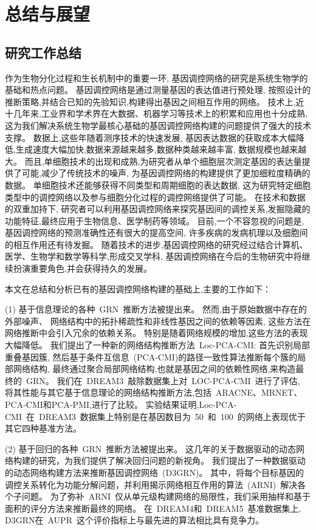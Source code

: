 \section{总结与展望}

\subsection{研究工作总结}

作为生物分化过程和生长机制中的重要一环,
基因调控网络的研究是系统生物学的基础和热点问题。
基因调控网络是通过测量基因的表达值进行预处理,
按照设计的推断策略,并结合已知的先验知识,构建得出基因之间相互作用的网络。
技术上,近十几年来,工业界和学术界在大数据、机器学习等技术上的积累和应用也十分成熟,
这为我们解决系统生物学最核心基础的基因调控网络构建的问题提供了强大的技术支撑。
数据上,这些年随着测序技术的快速发展,
基因表达数据的获取成本大幅降低,生成速度大幅加快,数据来源越来越多,数据种类越来越丰富, 数据规模也越来越大。
而且,单细胞技术的出现和成熟,为研究者从单个细胞层次测定基因的表达量提供了可能,减少了传统技术的噪声,
为基因调控网络的构建提供了更加细粒度精确的数据。
单细胞技术还能够获得不同类型和周期细胞的表达数据,
这为研究特定细胞类型中的调控网络以及参与细胞分化过程的调控网络提供了可能。
在技术和数据的双重加持下,
研究者可以利用基因调控网络来探究基因间的调控关系,发掘隐藏的功能特征,最终应用于生物信息、医学制药等领域。
目前,一个不容忽视的问题是,基因调控网络的预测准确性还有很大的提高空间,
许多疾病的发病机理以及细胞间的相互作用还有待发掘。
随着技术的进步,基因调控网络的研究经过结合计算机、医学、生物学和数学等科学,形成交叉学科,
基因调控网络在今后的生物研究中将继续扮演重要角色,并会获得持久的发展。

本文在总结和分析已有的基因调控网络构建的基础上,主要的工作如下：

(1) 基于信息理论的各种~GRN~推断方法被提出来。
然而,由于原始数据中存在的外部噪声、
网络结构中的拓扑稀疏性和非线性基因之间的依赖等因素,
这些方法在网络推断中会引入冗余的依赖关系。
特别是随着网络规模的增加,这些方法的表现大幅降低。
我们提出了一种新的网络结构推断方法~Loc-PCA-CMI: 首先识别局部重叠基因簇,
然后基于条件互信息~(PCA-CMI)的路径一致性算法推断每个簇的局部网络结构,
最终通过聚合局部网络结构,也就是基因之间的依赖性网络,来构造最终的~GRN。
我们在~DREAM3~敲除数据集上对~LOC-PCA-CMI~进行了评估,
将其性能与其它基于信息理论的网络结构推断方法,包括~ARACNE、MRNET、PCA-CMI和PCA-PMI,进行了比较。
实验结果证明,Loc-PCA-CMI~在~DREAM3~数据集上特别是在基因数目为~50~和~100~的网络上表现优于其它四种基准方法。

(2) 基于回归的各种~GRN~推断方法被提出来。
这几年的关于数据驱动的动态网络构建的研究，为我们提供了解决回归问题的新视角。
我们提出了一种数据驱动的动态网络构建方法来推断基因调控网络~(D3GRN)。
其中，将每个目标基因的调控关系转化为功能分解问题，并利用揭示网络相互作用的算法~(ARNI)~解决各个子问题。
为了弥补~ARNI~仅从单元级构建网络的局限性，我们采用抽样和基于面积的评分方法来推断最终的网络。
在~DREAM4和~DREAM5~基准数据集上, D3GRN在~AUPR~这个评价指标上与最先进的算法相比具有竞争力。

